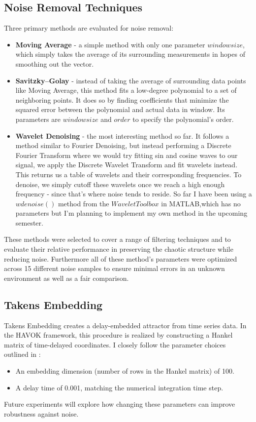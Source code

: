 \documentclass[11pt]{article}
\begin{document}
	\subsection{Noise Removal Techniques}
	Three primary methods are evaluated for noise removal:
	\begin{itemize}
		\item \textbf{Moving Average} - a simple method with only one parameter \(window size\), which simply takes the average of its surrounding measurements in hopes of smoothing out the vector.
		\item \textbf{Savitzky--Golay} - instead of taking the average of surrounding data points like Moving Average, this method fits a low-degree polynomial to a set of neighboring points. It does so by finding coefficients that minimize the squared error between the polynomial and actual data in window. Its parameters are \(window size\) and \(order\) to specify the polynomial's order.
		\item \textbf{Wavelet Denoising}\citep{luo2012} - the most interesting method so far. It follows a method similar to Fourier Denoising, but instead performing a Discrete Fourier Transform where we would try fitting sin and cosine waves to our signal, we apply the Discrete Wavelet Transform and fit wavelets instead. This returns us a table of wavelets and their corresponding frequencies. To denoise, we simply cutoff these wavelets once we reach a high enough frequency - since that's where noise tends to reside. So far I have been using a \(wdenoise()\) method from the \(Wavelet Toolbox\) in MATLAB,which has no parameters but I'm planning to implement my own method in the upcoming semester.
	\end{itemize}
	These methods were selected to cover a range of filtering techniques and to evaluate their relative performance in preserving the chaotic structure while reducing noise. Furthermore all of these method's parameters were optimized across 15 different noise samples to ensure minimal errors in an unknown environment as well as a fair comparison. 
	
	\subsection{Takens Embedding}
	Takens Embedding creates a delay-embedded attractor from time series data. In the HAVOK framework, this procedure is realized by constructing a Hankel matrix of time-delayed coordinates. I closely follow the parameter choices outlined in \citep{brunton2017}:
	\begin{itemize}
		\item An embedding dimension (number of rows in the Hankel matrix) of 100.
		\item A delay time of 0.001, matching the numerical integration time step.
	\end{itemize}
	Future experiments will explore how changing these parameters can improve robustness against noise.
	
\end{document}
